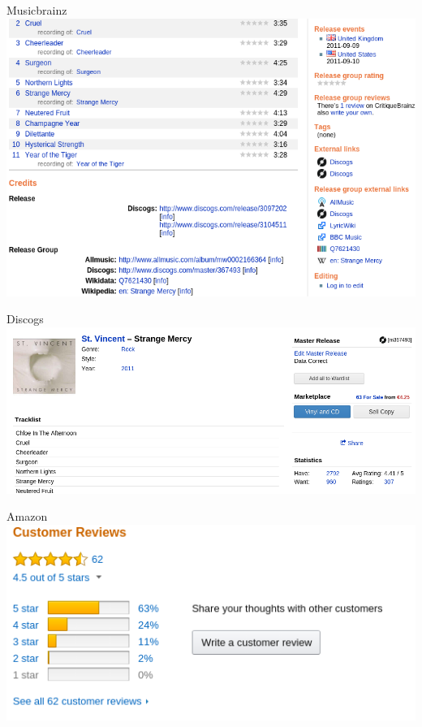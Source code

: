 \documentclass{beamer}
\begin{document}
\begin{frame}{Musicbrainz}
\centering
\includegraphics[width=\textwidth]{musicbrainz.png}
\end{frame}

\begin{frame}{Discogs}
\centering
\includegraphics[width=\textwidth]{discogs.png}
\end{frame}

\begin{frame}{Amazon}
\centering
\includegraphics[width=\textwidth]{amazon.png}
\end{frame}
\end{document}
